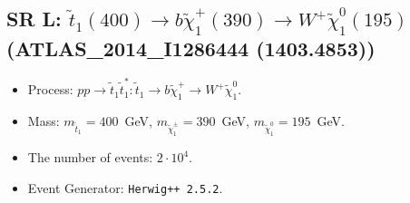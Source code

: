 \documentclass[12pt]{article}
\begin{document}
    
\subsection{SR L: $\tilde t_1(400) \to b \tilde \chi_1^+(390) \to W^+ \tilde \chi_1^0(195)$ (ATLAS\_2014\_I1286444 (1403.4853))} 


        \begin{itemize}
        \item  Process: $pp \to \tilde t_1 \tilde t_1^*: \tilde t_1 \to b \tilde \chi_1^+ \to W^+ \tilde \chi_1^0$.
        \item  Mass: $m_{\tilde t_1} = 400$~GeV, $m_{\tilde \chi_1^\pm} = 390$~GeV, $m_{\tilde \chi_1^0} = 195$~GeV.
        \item  The number of events: $2 \cdot 10^4$.
        \item  Event Generator: {\tt Herwig++ 2.5.2}.    
        \end{itemize}    
    
\end{document}
